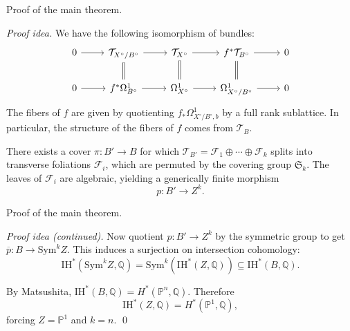 \documentclass{beamer}
\newcommand{\ol}{\overline}
\begin{document}
\begin{frame}[fragile]{Proof of the main theorem.}

{\it Proof idea.} 
We have the following isomorphism of bundles:
\begin{equation*}
\begin{tikzcd}
0 \arrow{r} & \mathcal{T}_{X^\circ/B^\circ} \arrow{r} \arrow[equals]{d} & \mathcal{T}_{X^\circ} \arrow{r} \arrow[equals]{d} & f^*\mathcal{T}_{B^\circ} \arrow{r} \arrow[equals]{d} & 0 \\
0 \arrow{r} & f^*\Omega_{B^\circ}^1 \arrow{r} & \Omega_{X^\circ}^1 \arrow{r} & \Omega_{X^\circ/B^\circ}^1 \arrow{r} & 0
\end{tikzcd}
\end{equation*}
The fibers of \(f\) are given by quotienting \(f_*\Omega^1_{X^\circ/B^\circ, b}\) 
by a full rank sublattice. In particular, the structure of the fibers of 
\(f\) comes from \(\mathcal{T}_B\). \pause \newline

There exists a cover \(\pi: B' \to B\) for which 
\(\mathcal{T}_{B'} = \mathcal{F}_1 \oplus \cdots \oplus \mathcal{F}_k\) splits 
into transverse foliations \(\mathcal{F}_i\), which are permuted by the 
covering group \(\mathfrak{S}_k\). \pause
The leaves of \(\mathcal{F}_i\) are algebraic, yielding a generically finite morphism 
\begin{equation*}
    p: B' \to Z^k.
\end{equation*}

\end{frame}


\begin{frame}{Proof of the main theorem.}

{\it Proof idea (continued).} Now quotient \(p: B' \to Z^k\) by the symmetric group 
to get \(\ol{p}: B \to \mathrm{Sym}^k Z\). This induces a surjection on 
intersection cohomology: 
\begin{equation*}
    \mathrm{IH}^*(\mathrm{Sym}^k Z, \mathbb{Q}) = 
    \mathrm{Sym}^k \left(\mathrm{IH}^*(Z, \mathbb{Q})\right) \subseteq
    \mathrm{IH}^*(B, \mathbb{Q}).
\end{equation*}
\pause

By Matsushita, \(\mathrm{IH}^*(B, \mathbb{Q}) = H^*(\mathbb{P}^n, \mathbb{Q})\). 
Therefore 
\[\mathrm{IH}^*(Z, \mathbb{Q}) = H^*(\mathbb{P}^1, \mathbb{Q}),\]
forcing \(Z = \mathbb{P}^1\) and \(k = n\).
\qed
\end{frame}


\end{document}
